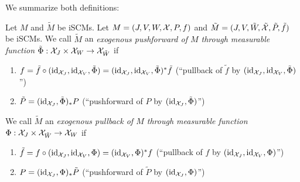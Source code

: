 We summarize both definitions:
\begin{Def}
  Let $M$ and $\tilde{M}$ be iSCMs.
  Let $M = \left ( J, V, W, \mathcal{X}, P, f \right )$ and $\tilde{M} = ( J, V, \tilde{W}, \tilde{\mathcal{X}}, \tilde{P}, \tilde{f} )$ be iSCMs.
  We call $\tilde{M}$ an \emph{exogenous pushforward of $M$ through measurable function $\tilde{\Phi} : \mathcal{X}_J \times \mathcal{X}_W \to \mathcal{X}_{\tilde{W}}$} if
  \begin{enumerate}
    \item $f = \tilde{f} \circ (\mathrm{id}_{\mathcal{X}_J}, \mathrm{id}_{\mathcal{X}_V}, \tilde{\Phi}) = (\mathrm{id}_{\mathcal{X}_J}, \mathrm{id}_{\mathcal{X}_V}, \tilde{\Phi})^* \tilde{f}$ (``pullback of $\tilde{f}$ by $(\mathrm{id}_{\mathcal{X}_J},\mathrm{id}_{\mathcal{X}_V},\tilde{\Phi})$'')
    \item $\tilde P = (\mathrm{id}_{\mathcal{X}_J},\tilde{\Phi})_* P$ (``pushforward of $P$ by $(\mathrm{id}_{\mathcal{X}_J},\tilde{\Phi})$'')
  \end{enumerate}
  We call $\tilde{M}$ an \emph{exogenous pullback of $M$ through measurable function $\Phi : \mathcal{X}_J \times \mathcal{X}_{\tilde W} \to \mathcal{X}_{W}$} if
  \begin{enumerate}
    \item $\tilde f = f \circ (\mathrm{id}_{\mathcal{X}_J}, \mathrm{id}_{\mathcal{X}_V}, \Phi) = (\mathrm{id}_{\mathcal{X}_V}, \Phi)^* f$ (``pullback of $f$ by $(\mathrm{id}_{\mathcal{X}_J},\mathrm{id}_{\mathcal{X}_V},\Phi)$'')
    \item $P = (\mathrm{id}_{\mathcal{X}_J},\Phi)_* \tilde{P}$ (``pushforward of $\tilde{P}$ by $(\mathrm{id}_{\mathcal{X}_J},\Phi)$'')
  \end{enumerate}

\end{Def}

